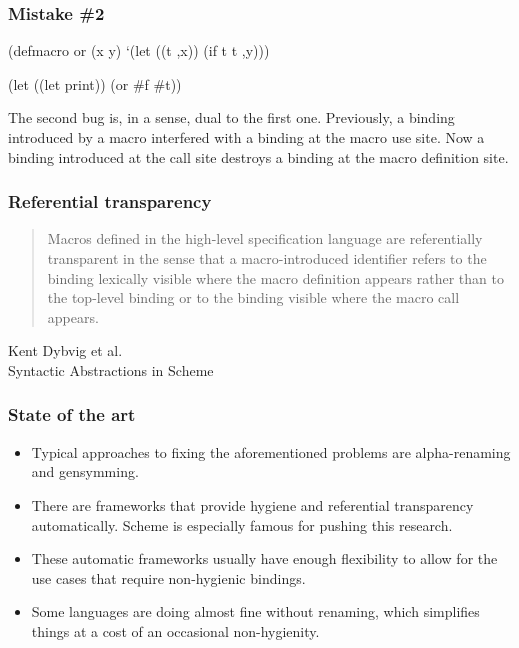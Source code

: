 \documentclass[hyperref={bookmarks=false}]{beamer}
\begin{document}
\begin{frame}[fragile]
\frametitle{Mistake \#2}

\begin{lstlistinglike}
\begin{semiverbatim}
(defmacro or (x y)
  `(let ((t ,x))
     (if t t ,y)))

(let ((let print))
  (or \#f \#t))
\end{semiverbatim}
\end{lstlistinglike}

The second bug is, in a sense, dual to the first one. Previously, a binding introduced by a macro
interfered with a binding at the macro use site. Now a binding introduced at the call site destroys
a binding at the macro definition site.
\end{frame}

\begin{frame}[fragile]
\frametitle{Referential transparency}

\begin{quote}
Macros defined in the high-level specification language are referentially
transparent in the sense that a macro-introduced identifier refers to the
binding lexically visible where the macro definition appears rather than to
the top-level binding or to the binding visible where the macro call appears.
\end{quote}

\begin{flushright}
\textemdash Kent Dybvig et al.\\
Syntactic Abstractions in Scheme
\end{flushright}
\end{frame}

\begin{frame}[fragile]
\frametitle{State of the art}

\begin{itemize}
\item Typical approaches to fixing the aforementioned problems
are alpha-renaming and gensymming.
\item There are frameworks that provide hygiene and referential transparency automatically.
Scheme is especially famous for pushing this research.
\item These automatic frameworks usually have enough flexibility to allow for
the use cases that require non-hygienic bindings.
\item Some languages are doing almost fine without renaming,
which simplifies things at a cost of an occasional non-hygienity.
\end{itemize}

\end{frame}
\end{document}
